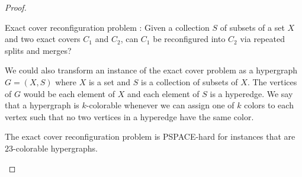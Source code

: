 \begin{proof}
\begin{defn}
Exact cover reconfiguration problem : Given a collection $S$ of subsets of a set $X$ and two exact covers $C_1$ and $C_2$, can $C_1$ be reconfigured into $C_2$ via repeated splits and merges? 
\end{defn}

\begin{defn}
We could also transform an instance of the exact cover problem as a hypergraph $G = (X, S)$ where $X$ is a set and $S$ is a collection of subsets of $X$. The vertices of $G$ would be each element of $X$ and each element of $S$ is a hyperedge. 
We say that a hypergraph is $k$-colorable whenever we can assign one of $k$ colors to each vertex such that no two vertices in a hyperedge have the same color.

\end{defn}

\begin{lemma}
The exact cover reconfiguration problem is PSPACE-hard for instances that are $23$-colorable hypergraphs. \cite{cardinal_reconfiguration_2018}
\end{lemma}

\end{proof}
